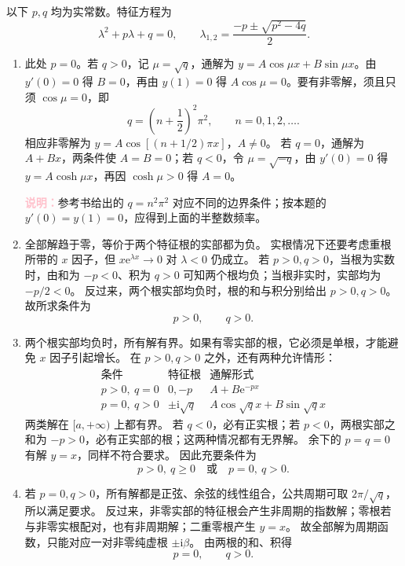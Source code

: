 \documentclass[UTF8,a4paper,11pt]{ctexart}
\newcommand{\e}{\mathrm e}
\newcommand{\note}[1]{\par\smallskip\noindent\textcolor{pink}{\bfseries 说明：}#1\par\smallskip}
\begin{document}
\begin{solution}
以下 $p,q$ 均为实常数。特征方程为
\[
\lambda^2+p\lambda+q=0,\qquad
\lambda_{1,2}=\frac{-p\pm\sqrt{p^2-4q}}2.
\]
\begin{enumerate}[label=(\arabic*)]
\item 此处 $p=0$。若 $q>0$，记 $\mu=\sqrt q$，通解为
$y=A\cos\mu x+B\sin\mu x$。由 $y'(0)=0$ 得 $B=0$，再由 $y(1)=0$ 得
$A\cos\mu=0$。要有非零解，须且只须 $\cos\mu=0$，即
\[
\boxed{q=\left(n+\frac12\right)^2\pi^2,\qquad n=0,1,2,\ldots.}
\]
相应非零解为 $y=A\cos[(n+1/2)\pi x]$，$A\ne0$。
若 $q=0$，通解为 $A+Bx$，两条件使 $A=B=0$；若 $q<0$，令 $\mu=\sqrt{-q}$，由 $y'(0)=0$ 得 $y=A\cosh\mu x$，再因 $\cosh\mu>0$ 得 $A=0$。
\note{参考书给出的 $q=n^2\pi^2$ 对应不同的边界条件；按本题的 $y'(0)=y(1)=0$，应得到上面的半整数频率。}

\item 全部解趋于零，等价于两个特征根的实部都为负。
实根情况下还要考虑重根所带的 $x$ 因子，但 $x\e^{\lambda x}\to0$ 对 $\lambda<0$ 仍成立。
若 $p>0,q>0$，当根为实数时，由和为 $-p<0$、积为 $q>0$ 可知两个根均负；当根非实时，实部均为 $-p/2<0$。
反过来，两个根实部均负时，根的和与积分别给出 $p>0,q>0$。
故所求条件为
\[
\boxed{p>0,\qquad q>0.}
\]

\item 两个根实部均负时，所有解有界。如果有零实部的根，它必须是单根，才能避免 $x$ 因子引起增长。
在 $p>0,q>0$ 之外，还有两种允许情形：
\[
\begin{array}{c|c|c}
\text{条件}&\text{特征根}&\text{通解形式}\\ \hline
p>0,\ q=0&0,-p&A+B\e^{-px}\\
p=0,\ q>0&\pm\mathrm i\sqrt q&A\cos\sqrt qx+B\sin\sqrt qx
\end{array}
\]
两类解在 $[a,+\infty)$ 上都有界。
若 $q<0$，必有正实根；若 $p<0$，两根实部之和为 $-p>0$，必有正实部的根；这两种情况都有无界解。
余下的 $p=q=0$ 有解 $y=x$，同样不符合要求。
因此充要条件为
\[
\boxed{p>0,\ q\ge0\quad\text{或}\quad p=0,\ q>0.}
\]

\item 若 $p=0,q>0$，所有解都是正弦、余弦的线性组合，公共周期可取 $2\pi/\sqrt q$，所以满足要求。
反过来，非零实部的特征根会产生非周期的指数解；零根若与非零实根配对，也有非周期解；二重零根产生 $y=x$。
故全部解为周期函数，只能对应一对非零纯虚根 $\pm\mathrm i\beta$。
由两根的和、积得
\[
\boxed{p=0,\qquad q>0.}
\]
\end{enumerate}
\end{solution}
\end{document}
